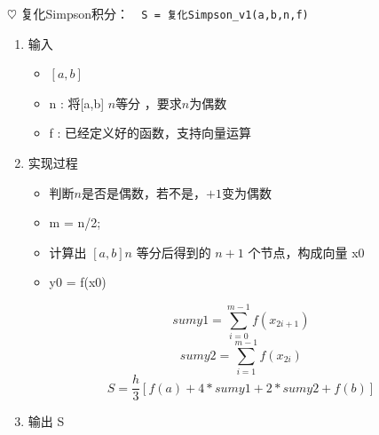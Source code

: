 \documentclass{xtupaper}
\begin{document}
$\heartsuit$ 复化Simpson积分：\verb|  S = 复化Simpson_v1(a,b,n,f)|
\begin{enumerate}
	\item 输入
		
		\begin{itemize}
					\item  $[a,b]$
					
					\item  n : 将[a,b] $n$等分 ，要求$ n $为偶数
					
					\item f : 已经定义好的函数，支持向量运算
					
		\end{itemize}


	\item 实现过程
			\begin{itemize}
						\item  判断$n$是否是偶数，若不是，$+1$变为偶数
						
						\item  m = n/2;
						
						\item 计算出 $[a, b] n$ 等分后得到的 $n + 1$ 个节点，构成向量 x0
						\item y0 = f(x0)
						
			\end{itemize}
	
	  \[sumy1 = \sum_{i=0}^{m-1}f(x_{2i+1}) \]
	\[ sumy2 = \sum_{i=1}^{m-1}f(x_{2i}) \] 
	\[S =\frac{h}{3}\left[f(a)+4*sumy1+2*sumy2+f(b)\right]\]

	\item 输出 S

\end{enumerate}

%			
%			
\end{document}
